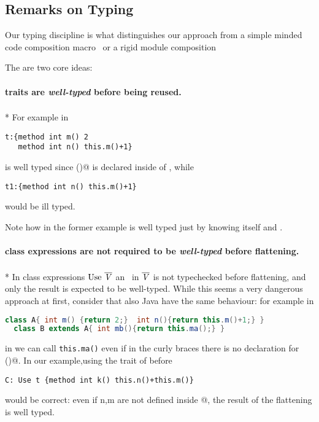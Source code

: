 \subsection{Remarks on Typing}
Our typing discipline is 
what distinguishes our approach from a simple minded code composition macro~\cite{bawden1999quasiquotation}
or a rigid module composition~\cite{ancona2002calculus}

The are two core ideas:
\paragraph*{traits are \emph{well-typed} before being reused.}${}_{}$\\*
 For example in

\begin{lstlisting}
t:{method int m() 2 
   method int n() this.m()+1}
\end{lstlisting}

\noindent \Q@t@ is well typed since \Q@m()@ is declared inside of \Q@t@, while

\begin{lstlisting}
t1:{method int n() this.m()+1} 
\end{lstlisting}
\noindent would be ill typed.

\noindent Note how in the former example \Q@ta@ is well typed just by
knowing itself and \Q@IA@.

\paragraph*{class expressions are not required to be \emph{well-typed} before flattening.}${}_{}$\\*
In class expressions  $\use\ \overline\mV$
an \mL\ in $\overline{\mathit{V}}$ is not typechecked before flattening, and only the result is expected to be well-typed.
While this seems a very dangerous approach at first, consider that also Java have the same behaviour:
for example in
\begin{lstlisting}[language=Java]
  class A{ int m() {return 2;}  int n(){return this.m()+1;} }
  class B extends A{ int mb(){return this.ma();} }
\end{lstlisting}

\noindent in \Q@B@ we can call \lstinline{this.ma()} even if in the curly braces there is no declaration for \Q@ma()@.
In our example,using the trait \Q@t@ of before

\begin{lstlisting}
C: Use t {method int k() this.n()+this.m()}
\end{lstlisting}
\noindent would be correct: even if n,m are not defined inside
@,
the result of the flattening is well typed.

